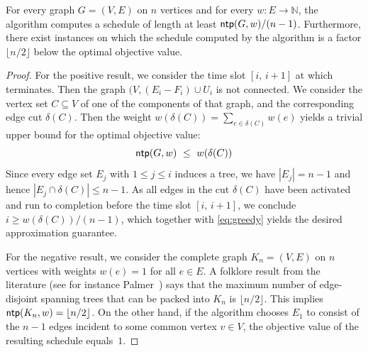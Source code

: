 \documentclass[runningheads]{llncs}
\newcommand{\N}{\mathbb{N}}
\DeclareMathOperator{\ntp}{\text{\sf ntp}}
\newcommand{\greedy}{\text{\sf Greedy}}
\begin{document}
\begin{theorem}
\label{th:greedy.approx}
For every graph $G=(V,E)$ on $n$ vertices and for every $w:E\to\N$, 
the {\greedy} algorithm computes a schedule of length at least $\ntp(G,w)/(n-1)$.
Furthermore, there exist instances on which the schedule computed by the 
{\greedy} algorithm is a factor $\lfloor n/2\rfloor$ below the optimal objective value.
\end{theorem}
\begin{proof}
For the positive result, we consider the time slot $[i,\,i+1]$ at which {\greedy} terminates.
Then the graph $(V,(E_i-F_i)\cup U_i$ is not connected.
We consider the vertex set $C\subseteq V$ of one of the components of that graph, and the
corresponding edge cut $\delta(C)$.
Then the weight $w(\delta(C))=\sum_{e\in\delta(C)}w(e)$ yields a trivial upper bound for the 
optimal objective value: 
\begin{equation}
\label{eq:greedy}
\ntp(G,w) ~\le~ w(\delta(C))
\end{equation}
Since every edge set $E_j$ with $1\le j\le i$ induces a tree, we have $|E_j|=n-1$ and hence
$|E_j\cap \delta(C)|\le n-1$.
As all edges in the cut $\delta(C)$ have been activated and run to completion before the 
time slot $[i,\,i+1]$, we conclude $i\ge w(\delta(C))/(n-1)$, which together with \eqref{eq:greedy}
yields the desired approximation guarantee.

For the negative result, we consider the complete graph $K_n=(V,E)$ on $n$ vertices with 
weights $w(e)=1$ for all $e\in E$.
A folklore result from the literature (see for instance Palmer~\cite{Palmer2001}) says that the 
maximum number of edge-disjoint spanning trees that can be packed into $K_n$ is $\lfloor n/2\rfloor$.
This implies $\ntp(K_n,w)=\lfloor n/2\rfloor$.
On the other hand, if the {\greedy} algorithm chooses $E_1$ to consist of the $n-1$ edges incident
to some common vertex $v\in V$, the objective value of the resulting schedule equals~$1$.
\end{proof}
\end{document}
